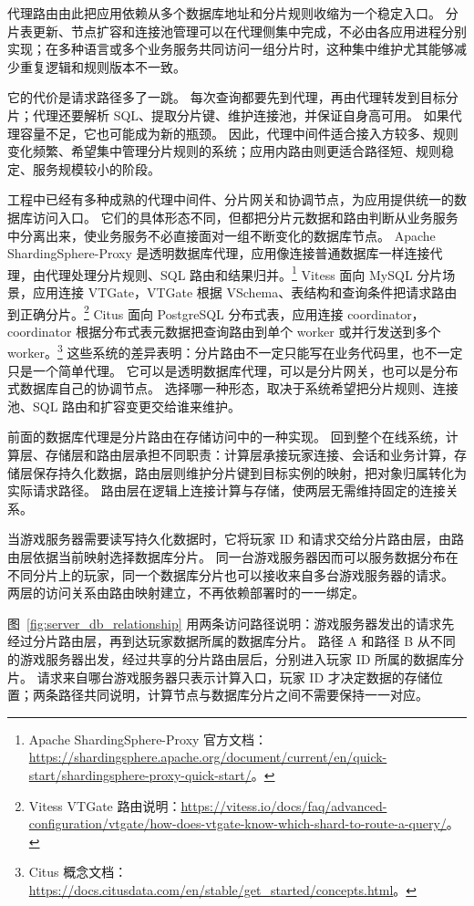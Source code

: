 代理路由由此把应用依赖从多个数据库地址和分片规则收缩为一个稳定入口。
分片表更新、节点扩容和连接池管理可以在代理侧集中完成，不必由各应用进程分别实现；在多种语言或多个业务服务共同访问一组分片时，这种集中维护尤其能够减少重复逻辑和规则版本不一致。

它的代价是请求路径多了一跳。
每次查询都要先到代理，再由代理转发到目标分片；代理还要解析 SQL、提取分片键、维护连接池，并保证自身高可用。
如果代理容量不足，它也可能成为新的瓶颈。
因此，代理中间件适合接入方较多、规则变化频繁、希望集中管理分片规则的系统；应用内路由则更适合路径短、规则稳定、服务规模较小的阶段。

工程中已经有多种成熟的代理中间件、分片网关和协调节点，为应用提供统一的数据库访问入口。
它们的具体形态不同，但都把分片元数据和路由判断从业务服务中分离出来，使业务服务不必直接面对一组不断变化的数据库节点。
Apache ShardingSphere-Proxy 是透明数据库代理，应用像连接普通数据库一样连接代理，由代理处理分片规则、SQL 路由和结果归并。\footnote{Apache ShardingSphere-Proxy 官方文档：\url{https://shardingsphere.apache.org/document/current/en/quick-start/shardingsphere-proxy-quick-start/}。}
Vitess 面向 MySQL 分片场景，应用连接 VTGate，VTGate 根据 VSchema、表结构和查询条件把请求路由到正确分片。\footnote{Vitess VTGate 路由说明：\url{https://vitess.io/docs/faq/advanced-configuration/vtgate/how-does-vtgate-know-which-shard-to-route-a-query/}。}
Citus 面向 PostgreSQL 分布式表，应用连接 coordinator，coordinator 根据分布式表元数据把查询路由到单个 worker 或并行发送到多个 worker。\footnote{Citus 概念文档：\url{https://docs.citusdata.com/en/stable/get_started/concepts.html}。}
这些系统的差异表明：分片路由不一定只能写在业务代码里，也不一定只是一个简单代理。
它可以是透明数据库代理，可以是分片网关，也可以是分布式数据库自己的协调节点。
选择哪一种形态，取决于系统希望把分片规则、连接池、SQL 路由和扩容变更交给谁来维护。

前面的数据库代理是分片路由在存储访问中的一种实现。
回到整个在线系统，计算层、存储层和路由层承担不同职责：计算层承接玩家连接、会话和业务计算，存储层保存持久化数据，路由层则维护分片键到目标实例的映射，把对象归属转化为实际请求路径。
路由层在逻辑上连接计算与存储，使两层无需维持固定的连接关系。

当游戏服务器需要读写持久化数据时，它将玩家 ID 和请求交给分片路由层，由路由层依据当前映射选择数据库分片。
同一台游戏服务器因而可以服务数据分布在不同分片上的玩家，同一个数据库分片也可以接收来自多台游戏服务器的请求。
两层的访问关系由路由映射建立，不再依赖部署时的一一绑定。

图~\ref{fig:server_db_relationship} 用两条访问路径说明：游戏服务器发出的请求先经过分片路由层，再到达玩家数据所属的数据库分片。
路径 A 和路径 B 从不同的游戏服务器出发，经过共享的分片路由层后，分别进入玩家 ID 所属的数据库分片。
请求来自哪台游戏服务器只表示计算入口，玩家 ID 才决定数据的存储位置；两条路径共同说明，计算节点与数据库分片之间不需要保持一一对应。

